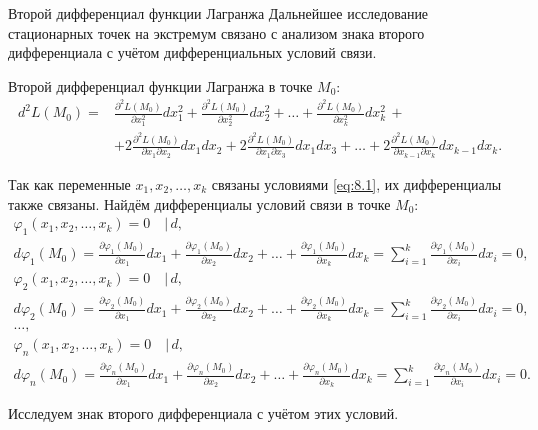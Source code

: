 \begin{tbox}{Второй дифференциал функции Лагранжа}
	Дальнейшее исследование стационарных точек на экстремум связано с анализом знака второго дифференциала с учётом дифференциальных условий связи.

	Второй дифференциал функции Лагранжа в точке $M_0$:
	\begin{equation*}
		\begin{aligned}
			d^2 L(M_0) = &\frac{\partial^2 L(M_0)}{\partial x_1^2} dx_1^2 + \frac{\partial^2 L(M_0)}{\partial x_2^2} dx_2^2 + \dots + \frac{\partial^2 L(M_0)}{\partial x_k^2} dx_k^2 \, + \\
			&+ 2 \frac{\partial^2 L(M_0)}{\partial x_1 \partial x_2} dx_1 dx_2 + 2 \frac{\partial^2 L(M_0)}{\partial x_1 \partial x_3} dx_1 dx_3 + \dots + 2 \frac{\partial^2 L(M_0)}{\partial x_{k-1} \partial x_k} dx_{k-1} dx_k.
		\end{aligned}
	\end{equation*}

	Так как переменные $x_1, x_2, \dots, x_k$ связаны условиями \eqref{eq:8.1}, их дифференциалы также связаны. Найдём дифференциалы условий связи в точке $M_0$:
	\begin{gather*}
		\varphi_1(x_1, x_2, \dots, x_k) = 0 \quad \Big| \, d, \\
		d\varphi_1(M_0) = \frac{\partial \varphi_1(M_0)}{\partial x_1} dx_1 + \frac{\partial \varphi_1(M_0)}{\partial x_2} dx_2 + \dots + \frac{\partial \varphi_1(M_0)}{\partial x_k} dx_k = \sum_{i=1}^k \frac{\partial \varphi_1(M_0)}{\partial x_i} dx_i = 0, \\
		\varphi_2(x_1, x_2, \dots, x_k) = 0 \quad \Big| \, d, \\
		d\varphi_2(M_0) = \frac{\partial \varphi_2(M_0)}{\partial x_1} dx_1 + \frac{\partial \varphi_2(M_0)}{\partial x_2} dx_2 + \dots + \frac{\partial \varphi_2(M_0)}{\partial x_k} dx_k = \sum_{i=1}^k \frac{\partial \varphi_2(M_0)}{\partial x_i} dx_i = 0, \\
		\dots, \\
		\varphi_n(x_1, x_2, \dots, x_k) = 0 \quad \Big| \, d, \\
		d\varphi_n(M_0) = \frac{\partial \varphi_n(M_0)}{\partial x_1} dx_1 + \frac{\partial \varphi_n(M_0)}{\partial x_2} dx_2 + \dots + \frac{\partial \varphi_n(M_0)}{\partial x_k} dx_k = \sum_{i=1}^k \frac{\partial \varphi_n(M_0)}{\partial x_i} dx_i = 0.
	\end{gather*}

	Исследуем знак второго дифференциала с учётом этих условий.
\end{tbox}

